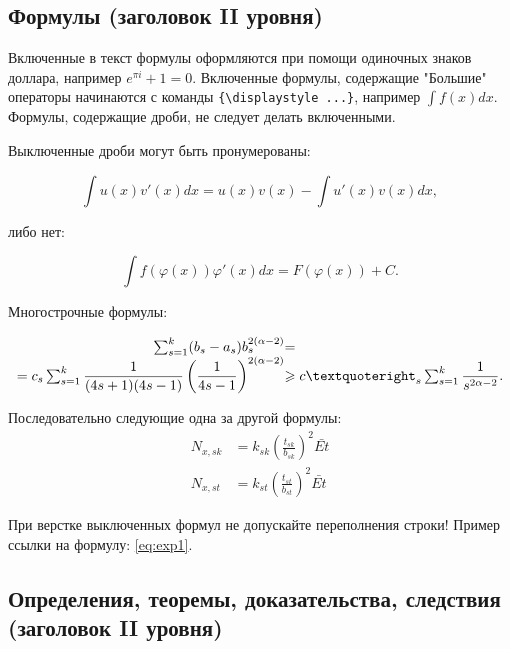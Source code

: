 \documentclass{math-mech-sci}
\begin{document}
\subsection{Формулы (заголовок II уровня)}

Включенные в текст формулы оформляются при помощи одиночных знаков доллара, например $e^{\pi i} + 1 = 0$.
Включенные формулы, содержащие "Большие" операторы начинаются с команды \verb"{\displaystyle ...}", например ${\displaystyle\int f(x)dx}$. Формулы, содержащие дроби, не следует делать включенными.

Выключенные дроби могут быть пронумерованы:

\begin{equation}
	\label{eq:exp1}
	\int u(x)v'(x)dx=u(x)v(x)-\int u'(x)v(x)dx,
\end{equation}

либо нет:

\begin{equation*}
	\int f(\varphi(x))\varphi'(x)dx=F(\varphi(x))+C.
\end{equation*}

Многострочные формулы:

\begin{equation}\label{eq:exp2}
\begin{array}{r@{}l}
	\sum^{k}_{s=1}(b_s-a_s)b^{2(\alpha-2)}_s  &= \\
	=c_s\sum^{k}_{s=1}\displaystyle\frac{1}{(4s+1)(4s-1)}\left(\displaystyle\frac{1}{4s-1}\right)^{2(\alpha-2)}
	&\geqslant c’_s\sum^{k}_{s=1}\displaystyle\frac{1}{s^{2\alpha-2}}.
\end{array}
\end{equation}

Последовательно следующие одна за другой формулы:
\begin{align}
	N_{x,sk} &= k_{sk}\left(\frac{t_{sk}}{b_{sk}}\right)^{2}\bar{Et}\\
	N_{x,st} &= k_{st}\left(\frac{t_{st}}{b_{st}}\right)^{2}\bar{Et}
\end{align}

При верстке выключенных формул не допускайте переполнения строки! Пример ссылки на формулу: \eqref{eq:exp1}.

\subsection{Определения, теоремы, доказательства, следствия (заголовок II уровня)}
\end{document}
